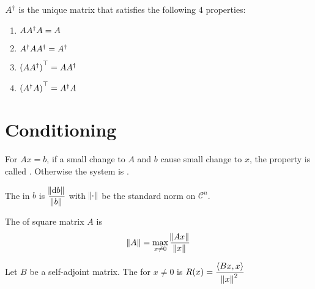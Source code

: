 \begin{theorem}
    ${A}^\dagger$ is the unique matrix that satisfies the following 4 properties:
    \begin{enumerate}
        \item $A {A}^\dagger A = A$
        \item ${A}^\dagger A{A}^\dagger = {A}^\dagger$
        \item ${(A {A}^\dagger)}^\top = A {A}^\dagger$
        \item ${({A}^\dagger A)}^\top = {A}^\dagger A$
    \end{enumerate}
\end{theorem}


%
%
%
%

\section{Conditioning}


\begin{definition}
    For $Ax=b$, if a small change to $A$ and $b$ cause small change to $x$, the property is called . Otherwise the system is .
\end{definition}

\begin{definition}
    The  in $b$ is $\dfrac{\norm{\dif{b}}}{\norm{b}}$ with $\norm{\cdot}$ be the standard norm on $\mathcal{C}^n$.
\end{definition}

\begin{definition}
    The  of square matrix $A$ is 
    \begin{equation}
        \norm{A} = \max_{x \neq 0} \frac{\norm{Ax}}{\norm{x}}
    \end{equation}
\end{definition}


\begin{definition}
    Let $B$ be a self-adjoint matrix. The  for $x \neq 0$ is $R(x) = \dfrac{\innerproduct{Bx}{x}}{\norm{x}^2}$
\end{definition}


